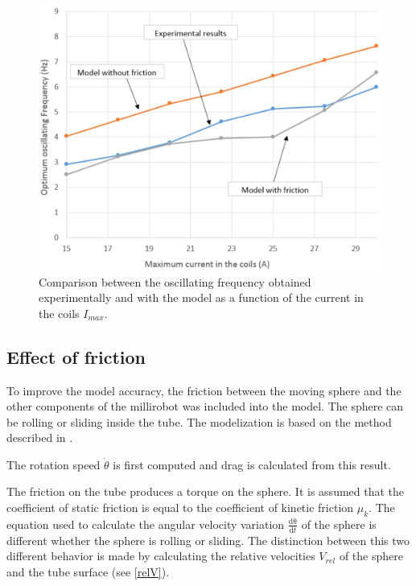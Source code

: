 \documentclass[letterpaper, 10 pt, conference]{ieeeconf}  %
\begin{document}
\begin{figure}
  \includegraphics[width=\linewidth]{figure3.eps}
  \caption{Comparison between the oscillating frequency obtained experimentally and with the model as a function of the current in the coils $I_{max}$.}
  \label{freq}
\end{figure}

\subsection{Effect of friction}

To improve the model accuracy, the friction between the moving sphere and the other components of the millirobot was included into the model. 
The sphere can be rolling or sliding inside the tube. 
The modelization is based on the method described in \cite{00319120303009}. 

The rotation speed $\dot{\theta} $ is first computed and drag is calculated from this result.\par

The friction on the tube produces a torque on the sphere. 
It is assumed that the coefficient of static friction is equal to the coefficient of kinetic friction $\mu_k$. 
The equation used to calculate the angular velocity variation $\frac{\mathrm{d\dot{\theta} } }{\mathrm{d} t}$ of the sphere is different whether the sphere is rolling or sliding. 
The distinction between this two different behavior is made by calculating the relative velocities $V_{rel}$ of the sphere and the tube surface (see \cref{relV}). \par
\end{document}
